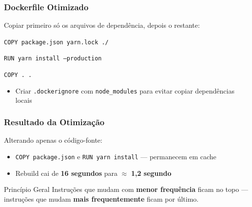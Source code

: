 \begin{frame}
  \frametitle{Dockerfile Otimizado}
  Copiar primeiro só os arquivos de dependência, depois o restante:

  \vspace{0.3em}
  \texttt{COPY package.json yarn.lock ./}

  \texttt{RUN yarn install --production}

  \texttt{COPY . .}

  \vspace{0.5em}
  \begin{itemize}
    \item Criar \texttt{.dockerignore} com \texttt{node\_modules}
          para evitar copiar dependências locais
  \end{itemize}
\end{frame}

\begin{frame}
  \frametitle{Resultado da Otimização}
  Alterando apenas o código-fonte:

  \vspace{0.5em}
  \begin{itemize}
    \item \texttt{COPY package.json} e \texttt{RUN yarn install} — permanecem em cache
    \item Rebuild cai de \textbf{16 segundos} para $\approx$ \textbf{1,2 segundo}
  \end{itemize}

  \vspace{0.5em}
  \begin{block}{Princípio Geral}
    Instruções que mudam com \textbf{menor frequência} ficam no topo —
    instruções que mudam \textbf{mais frequentemente} ficam por último.
  \end{block}
\end{frame}